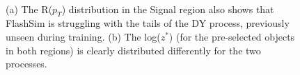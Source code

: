 \begin{figure}
    \myfloatalign
    \\
    \caption[Angular distributions]{ (a) The R($p_T$) distribution in the Signal region also shows that FlashSim is struggling with the tails of the DY process, previously unseen during training. (b) The log($z^*$) (for the pre-selected objects in both regions) is clearly distributed differently for the two processes.}\label{fig:angulardist}
    
\end{figure}

